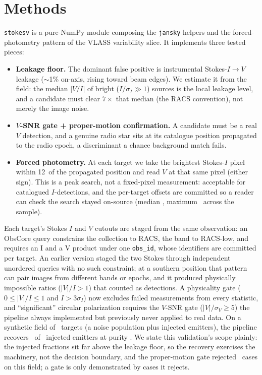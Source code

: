 \documentclass[twocolumn]{aastex631}
\newcommand{\code}[1]{\texttt{#1}}
\begin{document}
\section{Methods}
\code{stokesv} is a pure-NumPy module composing the \code{jansky} helpers and the forced-photometry
pattern of the VLASS variability slice. It implements three tested pieces:
\begin{itemize}
\item \textbf{Leakage floor.} The dominant false positive is instrumental Stokes-$I\!\to\!V$ leakage
($\sim$1\% on-axis, rising toward beam edges). We estimate it from the field: the median $|V/I|$ of
bright ($I/\sigma_I\gg1$) sources is the local leakage level, and a candidate must clear
$7\times$ that median (the RACS convention), not merely the image noise.
\item \textbf{$V$-SNR gate + proper-motion confirmation.} A candidate must be a real $V$ detection, and
a genuine radio star sits at its catalogue position propagated to the radio epoch, a
discriminant a chance background match fails.
\item \textbf{Forced photometry.} At each target we take the brightest Stokes-$I$ pixel within
12\arcsec\ of the propagated position and read $V$ at that same pixel (either sign). This is a peak search, not a fixed-pixel measurement: acceptable for catalogued $I$-detections, and the
per-target offsets are committed so a reader can check the search stayed on-source (median
\svMedOffset\arcsec, maximum \svMaxOffset\arcsec\ across the sample).
\end{itemize}
Each target's Stokes $I$ and $V$ cutouts are staged from the same observation: an
ObsCore query constrains the collection to RACS, the band to RACS-low, and requires an I and a
V product under one \code{obs\_id}, whose identifiers are committed per target. An earlier
version staged the two Stokes through independent unordered queries with no such constraint; at a southern position that pattern can pair images from different bands or epochs, and it
produced physically impossible ratios ($|V|/I>1$) that counted as detections. A physicality
gate ($0\le|V|/I\le1$ and $I>3\sigma_I$) now excludes failed measurements from every
statistic, and ``significant'' circular polarization requires the $V$-SNR gate
($|V|/\sigma_V\ge5$) the pipeline always implemented but previously never applied to real
data.
On a synthetic field of \svNtargets\ targets (a noise population plus injected emitters), the
pipeline recovers \svNrecovered\ of \svNinjected\ injected emitters at purity \svPurity. We
state this validation's scope plainly: the injected fractions sit far above the leakage floor,
so the recovery exercises the machinery, not the decision boundary, and the proper-motion gate
rejected \svNpmrejected\ cases on this field; a gate is only demonstrated by cases it rejects.
\end{document}

